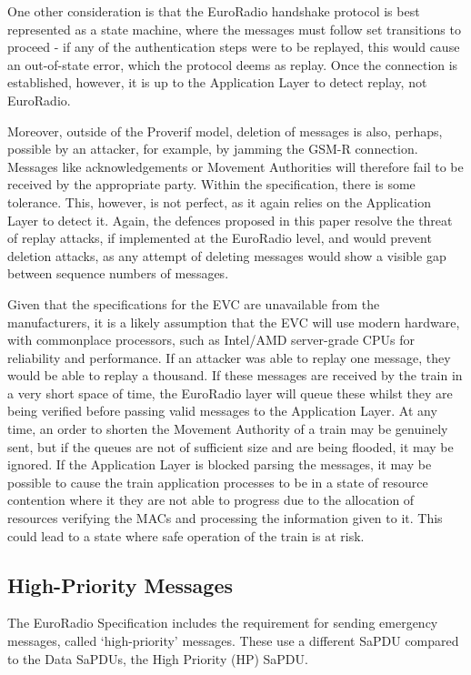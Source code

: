 \documentclass[twoside,11pt,a4paper]{article}
\begin{document}
One other consideration is that the EuroRadio handshake protocol is best represented as a state machine, where the messages must follow set transitions to proceed - if any of the authentication steps were to be replayed, this would cause an out-of-state error, which the protocol deems as replay. Once the connection is established, however, it is up to the Application Layer to detect replay, not EuroRadio.

Moreover, outside of the Proverif model, deletion of messages is also, perhaps, possible by an attacker, for example, by jamming the GSM-R connection. Messages like acknowledgements or Movement Authorities will therefore fail to be received by the appropriate party. Within the specification, there is some tolerance. This, however, is not perfect, as it again relies on the Application Layer to detect it. Again, the defences proposed in this paper resolve the threat of replay attacks, if implemented at the EuroRadio level, and would prevent deletion attacks, as any attempt of deleting messages would show a visible gap between sequence numbers of messages.

Given that the specifications for the EVC are unavailable from the manufacturers, it is a likely assumption that the EVC will use modern hardware, with commonplace processors, such as Intel/AMD server-grade CPUs for reliability and performance. If an attacker was able to replay one message, they would be able to replay a thousand. If these messages are received by the train in a very short space of time, the EuroRadio layer will queue these whilst they are being verified before passing valid messages to the Application Layer. At any time, an order to shorten the Movement Authority of a train may be genuinely sent, but if the queues are not of sufficient size and are being flooded, it may be ignored. If the Application Layer is blocked parsing the messages, it may be possible to cause the train application processes to be in a state of resource contention where it they are not able to progress due to the allocation of resources verifying the MACs and processing the information given to it. This could lead to a state where safe operation of the train is at risk.
\clearpage

\subsection{High-Priority Messages}
The EuroRadio Specification includes the requirement for sending emergency messages, called `high-priority' messages. These use a different SaPDU compared to the Data SaPDUs, the High Priority (HP) SaPDU.
\end{document}
